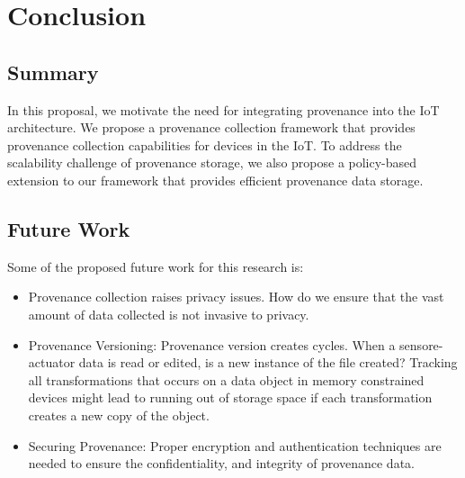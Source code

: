 
\chapter{Conclusion}

\section{Summary}
In this proposal, we motivate the need for integrating provenance into the IoT architecture. We propose a provenance collection framework that provides provenance collection capabilities for devices in the IoT. To address the scalability challenge of provenance storage, we also propose a  policy-based extension to our framework that provides efficient provenance data storage.

\section{Future Work}

Some of the proposed future work for this research is:
\begin{itemize}

\item Provenance collection raises privacy issues. How do we ensure that the vast amount of data collected is not invasive to privacy.

\item Provenance Versioning: Provenance version creates cycles. When a sensore-actuator data is read or edited, is a new instance of the file created? Tracking all transformations that occurs on a data object in memory constrained devices might lead to running out of storage space if each transformation creates a new copy of the object.

\item Securing Provenance: Proper encryption and authentication techniques \cite{Hasan:2009:CFP:1525908.1525909} are needed to ensure the confidentiality, and integrity of provenance data.

\end{itemize}

